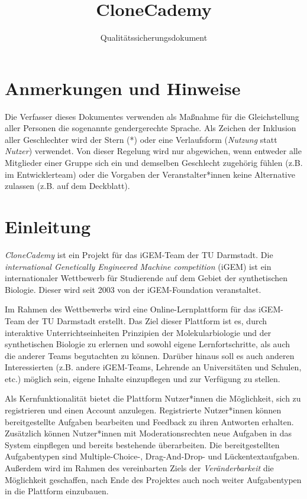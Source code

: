 \documentclass[accentcolor=tud0b,12pt,paper=a4]{tudreport}
\title{CloneCademy}
\subtitle{Qualitätssicherungsdokument}
\begin{document}
\maketitle
\tableofcontents

\chapter*{Anmerkungen und Hinweise}
Die Verfasser dieses Dokumentes verwenden als Maßnahme für die Gleichstellung aller Personen die sogenannte gendergerechte Sprache. Als Zeichen der Inklusion aller Geschlechter wird der Stern (*) oder eine Verlaufsform (\emph{Nutzung} statt \emph{Nutzer}) verwendet. Von dieser Regelung wird nur abgewichen, wenn entweder alle Mitglieder einer Gruppe sich ein und demselben Geschlecht zugehörig fühlen (z.B. im Entwicklerteam) oder die Vorgaben der Veranstalter*innen keine Alternative zulassen (z.B. auf dem Deckblatt).

\chapter{Einleitung}

\emph{CloneCademy} ist ein Projekt für das iGEM-Team der TU Darmstadt. Die \emph{international Genetically Engineered Machine competition} (iGEM) ist ein internationaler Wettbewerb für Studierende auf dem Gebiet der synthetischen Biologie.
Dieser wird seit 2003 von der iGEM-Foundation veranstaltet.

Im Rahmen des Wettbewerbs wird eine Online-Lernplattform für das iGEM-Team der TU Darmstadt erstellt. Das Ziel dieser Plattform ist es, durch interaktive Unterrichtseinheiten Prinzipien der Molekularbiologie und der synthetischen Biologie zu erlernen und sowohl eigene Lernfortschritte, als auch die anderer Teams begutachten zu können. Darüber hinaus soll es auch anderen Interessierten (z.B. andere iGEM-Teams, Lehrende an Universitäten und Schulen, etc.) möglich sein, eigene Inhalte einzupflegen und zur Verfügung zu stellen.

Als Kernfunktionalität bietet die Plattform Nutzer*innen die Möglichkeit, sich zu registrieren und einen Account anzulegen. Registrierte Nutzer*innen können bereitgestellte Aufgaben bearbeiten und Feedback zu ihren Antworten erhalten. Zusätzlich können Nutzer*innen mit Moderationsrechten neue Aufgaben in das System einpflegen und bereits bestehende überarbeiten. Die bereitgestellten Aufgabentypen sind Multiple-Choice-, Drag-And-Drop- und Lückentextaufgaben. Außerdem wird im Rahmen des vereinbarten Ziels der \emph{Veränderbarkeit} die Möglichkeit geschaffen, nach Ende des Projektes auch noch weiter Aufgabentypen in die Plattform einzubauen.
\end{document}
